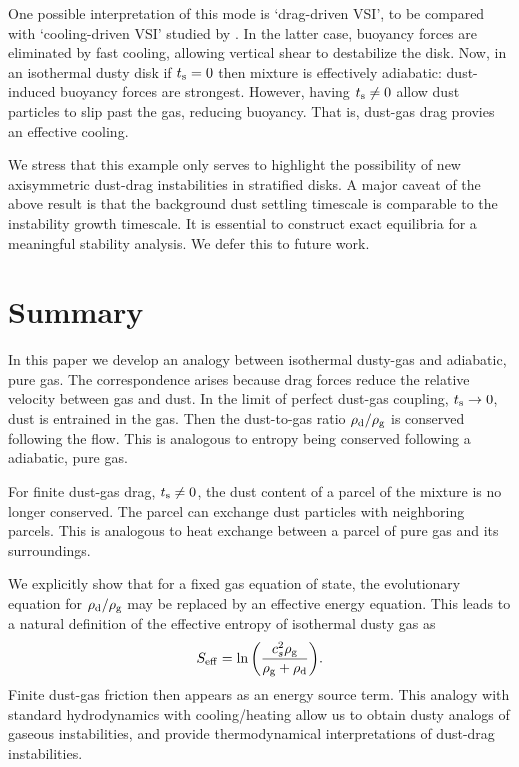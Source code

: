 One possible interpretation of this mode is `drag-driven VSI', to be 
compared with `cooling-driven VSI' studied by \cite{lin15}. In the
latter case, buoyancy forces are eliminated by fast
cooling, allowing vertical shear to destabilize the disk. Now, in an
isothermal dusty disk if $t_\mathrm{s}=0$ then mixture is 
effectively adiabatic: dust-induced buoyancy forces are
strongest. However, having $t_\mathrm{s}\neq0$ allow dust particles to slip
past the gas, reducing buoyancy. That is, dust-gas drag
provies an effective cooling. 

We stress that this example only serves to highlight
the possibility of new axisymmetric dust-drag instabilities in
stratified disks. A major caveat of the above result is that 
 the background dust settling timescale is comparable to the instability
growth timescale. It is essential to construct
exact equilibria for a meaningful stability analysis. We defer this
to future work.  


\section{Summary}\label{summary}
In this paper we develop an analogy between isothermal 
dusty-gas and adiabatic, pure gas. The correspondence arises
because drag forces reduce the relative velocity between gas and
dust. In the limit of perfect dust-gas coupling, $t_\mathrm{s} \to 0$,  
 dust is entrained in 
the gas. Then the dust-to-gas ratio $\rho_\mathrm{d}/\rho_\mathrm{g}$ is conserved
following the flow. This is analogous to entropy being conserved
following a adiabatic, pure gas. 

For finite dust-gas drag, $t_\mathrm{s}\neq 0$, the dust content of a 
parcel of the mixture is no longer conserved. The parcel 
can exchange dust particles with neighboring parcels. %
This is analogous to heat exchange between a parcel of pure gas and its surroundings.   

We explicitly show that for a fixed gas equation of state, the  
evolutionary equation for $\rho_\mathrm{d}/\rho_\mathrm{g}$ may be replaced by an 
effective energy equation. This leads to a 
natural definition of the effective entropy of isothermal dusty gas as  
\begin{align*}
  S_\mathrm{eff}  = \ln{\left(\frac{c_s^2\rho_\mathrm{g}}{\rho_\mathrm{g}+\rho_\mathrm{d}}\right)}.  
\end{align*}
Finite dust-gas friction then appears as an energy
source term.  This analogy with standard 
hydrodynamics with cooling/heating allow us to obtain dusty analogs of gaseous
instabilities, and provide thermodynamical interpretations of  
dust-drag instabilities. 


